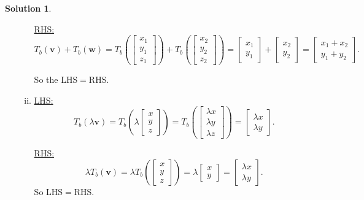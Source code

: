 \documentclass[12pt]{report} %
\theoremstyle{definition}
\newtheorem{solution}{Solution}
\begin{document}
\begin{solution}
\begin{enumerate}[(a)]
\begin{enumerate}[(i)]
    \noindent\underline{RHS:}
    \[
    T_b(\mathbf{v})+T_b(\mathbf{w})=T_b\left( \begin{bmatrix} x_1\\y_1\\z_1\end{bmatrix}\right) + T_b\left(\begin{bmatrix} x_2\\y_2\\z_2\end{bmatrix}\right)=\begin{bmatrix} x_1\\y_1\end{bmatrix}+\begin{bmatrix} x_2\\y_2\end{bmatrix}=\begin{bmatrix} x_1+x_2\\y_1+y_2\end{bmatrix}.
    \]
    
    So the LHS$=$RHS.
    
    \item     \noindent\underline{LHS:}
    \[
    T_b(\lambda \mathbf{v})=T_b\left( \lambda \begin{bmatrix} x\\y\\z\end{bmatrix}\right)=T_b\left( \begin{bmatrix} \lambda x\\ \lambda y \\ \lambda z \end{bmatrix}\right)=\begin{bmatrix} \lambda x\\ \lambda y \end{bmatrix}.
    \]
    
    \noindent\underline{RHS:}
    \[
    \lambda T_b(\mathbf{v})=\lambda T_b\left( \begin{bmatrix} x\\y\\z\end{bmatrix}\right) = \lambda \begin{bmatrix} x\\y\end{bmatrix}=\begin{bmatrix} \lambda x \\ \lambda y\end{bmatrix}.
    \]
    So LHS$=$RHS.
    

\end{enumerate}
\end{enumerate}
\end{solution}
\end{document}
